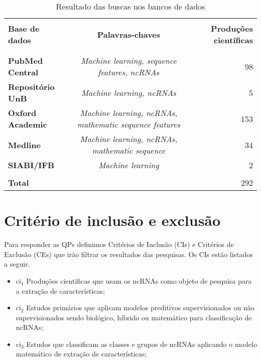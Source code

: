 \begin{table}[h!]
  \begin{center}
    \caption{Resultado das buscas nos bancos de dados}
    \label{tab:table2}
    \begin{tabular}{l c r} %
      \hline \\
      \textbf{Base de dados} & \textbf{Palavras-chaves} & \textbf{Produções científicas} \\ \\
      \hline \\
      \textbf{PubMed Central} & \textit{Machine learning, sequence features, ncRNAs} & 98\\
      \textbf{Repositório UnB} & \textit{Machine learning, ncRNAs} & 5 \\
      \textbf{Oxford Academic} & \textit{Machine learning, ncRNAs, mathematic sequence features} & 153\\
      \textbf{Medline} & \textit{Machine learning, ncRNAs, mathematic sequence} & 34\\
      \textbf{SIABI/IFB} & \textit{Machine learning} & 2\\ 
      \hline \\
      \textbf{Total} & & 292  
    \end{tabular}
  \end{center}
\end{table}

\section{Critério de inclusão e exclusão}

Para responder as QPs definimos Critérios de Inclusão (CIs) e Critérios de Exclusão (CEs) que irão filtrar os resultados das pesquisas. Os CIs estão listados a seguir.

\begin{itemize}
  \item \ac{ci}$_{1}$ Produções científicas que usam os \ac{ncRNAs} como objeto de pesquisa para a extração de características;
  \item \ac{ci}$_{2}$ Estudos primários que aplicam modelos preditivos supervisionados ou não supervisionados sendo biológico, híbrido ou matemático para classificação de \ac{ncRNAs};
  \item \ac{ci}$_{3}$ Estudos que classificam as classes e grupos de ncRNAs aplicando o modelo matemático de extração de características;
\end{itemize}

